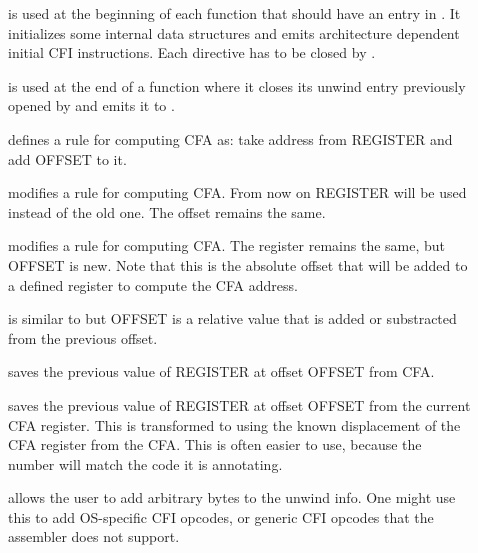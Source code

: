 \begin{description}
\item[] is used at the beginning of each
  function that should have an entry in . It
  initializes some internal data structures and emits architecture
  dependent initial CFI instructions.  Each 
  directive has to be closed by .
  
\item[] is used at the end of a function
  where it closes its unwind entry previously opened by
   and emits it to .
  
\item[] defines a
  rule for computing CFA as: take address from REGISTER and add OFFSET
  to it.
  
\item[] modifies a
  rule for computing CFA. From now on REGISTER will be used instead of
  the old one. The offset remains the same.
  
\item[] modifies a rule for
  computing CFA. The register remains the same, but OFFSET is new.
  Note that this is the absolute offset that will be added to a defined
  register to compute the CFA address.
  
\item[] is similar to
   but OFFSET is a relative value that is
  added or substracted from the previous offset.
  
\item[] saves the previous
  value of REGISTER at offset OFFSET from CFA.
  
\item[] saves the
  previous value of REGISTER at offset OFFSET from the current CFA
  register.  This is transformed to  using the
  known displacement of the CFA register from the CFA.  This is often
  easier to use, because the number will match the code it is
  annotating.
  
\item[]  allows the user to
  add arbitrary bytes to the unwind info.  One might use this to add
  OS-specific CFI opcodes, or generic CFI opcodes that the assembler
  does not support.
\end{description}

